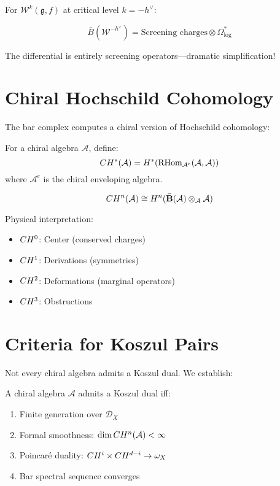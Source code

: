 For $\mathcal{W}^k(\mathfrak{g}, f)$ at critical level $k = -h^\vee$:

$$\bar{B}(\mathcal{W}^{-h^\vee}) = \text{Screening charges} \otimes \Omega^*_{\text{log}}$$

The differential is entirely screening operators—dramatic simplification!

\section{Chiral Hochschild Cohomology}

The bar complex computes a chiral version of Hochschild cohomology:

\begin{definition}
For a chiral algebra $\mathcal{A}$, define:
$$CH^*(\mathcal{A}) = H^*(\text{RHom}_{\mathcal{A}^e}(\mathcal{A}, \mathcal{A}))$$
where $\mathcal{A}^e$ is the chiral enveloping algebra.
\end{definition}

\begin{theorem}
$$CH^n(\mathcal{A}) \cong H^n(\bar{\mathbf{B}}(\mathcal{A}) \otimes_{\mathcal{A}} \mathcal{A})$$
\end{theorem}

Physical interpretation:
\begin{itemize}
\item $CH^0$: Center (conserved charges)
\item $CH^1$: Derivations (symmetries)
\item $CH^2$: Deformations (marginal operators)
\item $CH^3$: Obstructions
\end{itemize}

\section{Criteria for Koszul Pairs}

Not every chiral algebra admits a Koszul dual. We establish:

\begin{theorem}
A chiral algebra $\mathcal{A}$ admits a Koszul dual iff:
\begin{enumerate}
\item Finite generation over $\mathcal{D}_X$
\item Formal smoothness: $\dim CH^n(\mathcal{A}) < \infty$
\item Poincaré duality: $CH^i \times CH^{d-i} \to \omega_X$
\item Bar spectral sequence converges
\end{enumerate}
\end{theorem}

